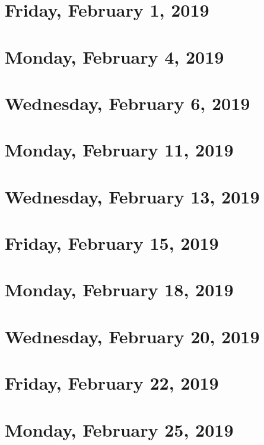 \documentclass[reqno]{amsart}
\begin{document}
\section{Friday, February 1, 2019}    
    

\section{Monday, February 4, 2019}
    

\section{Wednesday, February 6, 2019}
    

\section{Monday, February 11, 2019}
    

\section{Wednesday, February 13, 2019}
    
    
\section{Friday, February 15, 2019}
    
    
\section{Monday, February 18, 2019}
    

\section{Wednesday, February 20, 2019}
    
    
\section{Friday, February 22, 2019}
    

\section{Monday, February 25, 2019}
    
\end{document}

